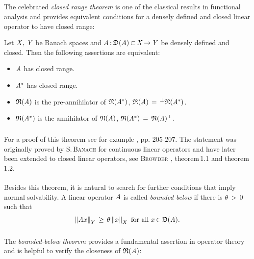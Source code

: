 \documentclass[11pt,twoside]{article}
\begin{document}
\subparagraph{} %
The celebrated \textit{closed range theorem} 
is one of the classical results in functional analysis 
and provides equivalent conditions
for a densely defined and closed linear operator to have closed range:

\begin{theorem1}\label{CLOSED_RANGE_THEOREM}
Let $\mathit{X},\,\mathit{Y}$ be Banach spaces
and $\mathit{A} {\,:\,} \mathfrak{D}(\mathit{A}) {\,\subset\,} \mathit{X} {\,\to\,} \mathit{Y}$
be densely defined and closed.
Then the following assertions are equivalent:

\begin{itemize}[leftmargin=9mm]
\item[(a)] $\mathit{A}$ has closed range.
\item[(b)] $\mathit{A}^*$ has closed range.
\item[(c)] $\mathfrak{R}(\mathit{A}) $ is the pre-annihilator of $\mathfrak{N}(\mathit{A}^*)$,
           {\ie} $\mathfrak{R}(\mathit{A}) \,=\, ^{\bot}\mathfrak{N}(\mathit{A}^*) $.
\item[(d)] $\mathfrak{R}(\mathit{A}^*)$ is the annihilator of $\mathfrak{N}(\mathit{A})$,
           {\ie} $\mathfrak{R}(\mathit{A}^*) \,=\, \mathfrak{N}(\mathit{A}) ^{\bot}$.
\end{itemize}
\end{theorem1}

\subparagraph{}
For a proof of this theorem see for example \cite{Yo}, pp. 205-207.
The statement was originally proved by \textsc{S.\,Banach}
for continuous linear operators and
have later been extended to closed linear operators,
see \textsc{Browder} \cite{Br1}, theorem\,1.1 and theorem\,1.2.

\paragraph{} %
Besides this theorem,
it is natural to search for further conditions
that imply normal solvability.
A linear operator $\mathit{A}$ is called \textit{bounded below}
if there is $\theta {\,>\,} 0$ such that
\begin{equation}\label{BOUNDED_BELOW_CONDITION}
\left\lVert \mathit{A} x \right\rVert_Y \, \geq \, \theta \left\lVert x \right\rVert_X \mbox{ for all } x {\,\in\,} \mathfrak{D}(\mathit{A}).
\end{equation}

\subparagraph{} %
The \textit{bounded-below theorem} provides a fundamental assertion
in operator theory and is helpful to verify the closeness of $\mathfrak{R}(\mathit{A})$:
\end{document}
